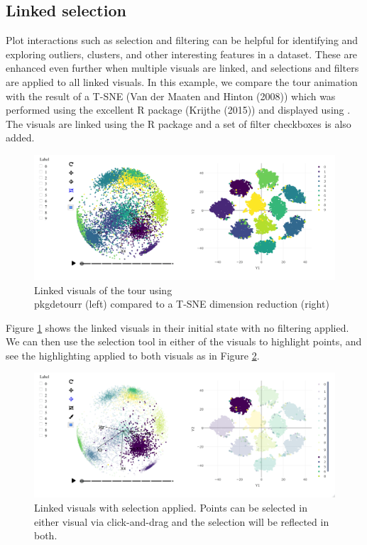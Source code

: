 \hypertarget{linked-selection}{%
\subsection{Linked selection}\label{linked-selection}}

Plot interactions such as selection and filtering can be helpful for identifying and exploring outliers, clusters, and other interesting features in a dataset. These are enhanced even further when multiple visuals are linked, and selections and filters are applied to all linked visuals. In this example, we compare the tour animation with the result of a T-SNE (Van der Maaten and Hinton (2008)) which was performed using the excellent  R package (Krijthe (2015)) and displayed using . The visuals are linked using the R package  and a set of filter checkboxes is also added.

\begin{figure}
\includegraphics[width=\textwidth]{figures/mnist/case-study-linked-brushing-full} \caption{Linked visuals of the tour using \\pkg{detourr} (left) compared to a T-SNE dimension reduction (right)}\label{fig:linked-tsne-full}
\end{figure}

Figure \ref{fig:linked-tsne-full} shows the linked visuals in their initial state with no filtering applied. We can then use the selection tool in either of the visuals to highlight points, and see the highlighting applied to both visuals as in Figure \ref{fig:linked-tsne-selection}.

\begin{figure}
\includegraphics[width=\textwidth]{figures/mnist/case-study-linked-brushing-selection} \caption{Linked visuals with selection applied. Points can be selected in either visual via click-and-drag and the selection will be reflected in both.}\label{fig:linked-tsne-selection}
\end{figure}

